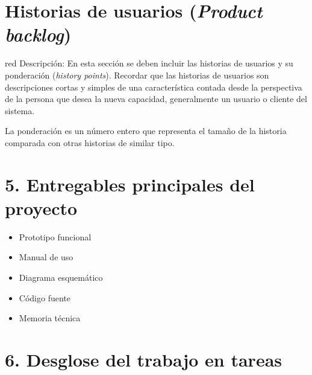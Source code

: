 \documentclass[11pt]{charter}
\begin{document}
\section{Historias de usuarios (\textit{Product backlog})}
\label{sec:backlog}

\begin{consigna}{red}
Descripción: En esta sección se deben incluir las historias de usuarios y su ponderación (\textit{history points}). Recordar que las historias de usuarios son descripciones cortas y simples de una característica contada desde la perspectiva de la persona que desea la nueva capacidad, generalmente un usuario o cliente del sistema.

La ponderación es un número entero que representa el tamaño de la historia comparada con otras historias de similar tipo.
\end{consigna}


\section{5. Entregables principales del proyecto}
\label{sec:entregables}

\begin{itemize}
\item Prototipo funcional
\item Manual de uso
\item Diagrama esquemático
\item Código fuente
\item Memoria técnica
\end{itemize}

\section{6. Desglose del trabajo en tareas}
\label{sec:wbs}
\end{document}
